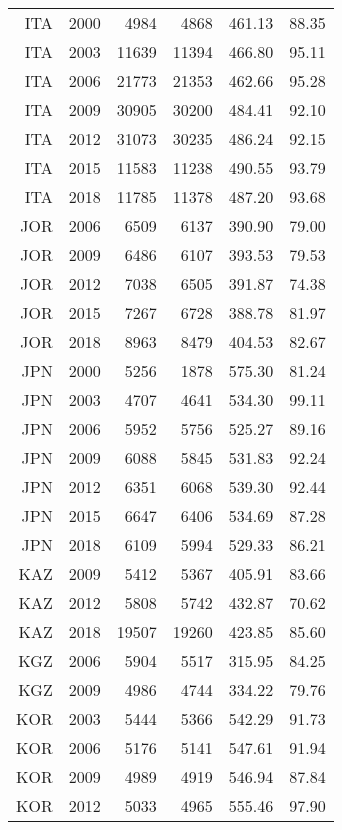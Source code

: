 \begin{longtable}{|r|r|r|r|r|r|}
    ITA   & 2000  & 4984  & 4868  & 461.13 & 88.35 \\
    ITA   & 2003  & 11639 & 11394 & 466.80 & 95.11 \\
    ITA   & 2006  & 21773 & 21353 & 462.66 & 95.28 \\
    ITA   & 2009  & 30905 & 30200 & 484.41 & 92.10 \\
    ITA   & 2012  & 31073 & 30235 & 486.24 & 92.15 \\
    ITA   & 2015  & 11583 & 11238 & 490.55 & 93.79 \\
    ITA   & 2018  & 11785 & 11378 & 487.20 & 93.68 \\
    JOR   & 2006  & 6509  & 6137  & 390.90 & 79.00 \\
    JOR   & 2009  & 6486  & 6107  & 393.53 & 79.53 \\
    JOR   & 2012  & 7038  & 6505  & 391.87 & 74.38 \\
    JOR   & 2015  & 7267  & 6728  & 388.78 & 81.97 \\
    JOR   & 2018  & 8963  & 8479  & 404.53 & 82.67 \\
    JPN   & 2000  & 5256  & 1878  & 575.30 & 81.24 \\
    JPN   & 2003  & 4707  & 4641  & 534.30 & 99.11 \\
    JPN   & 2006  & 5952  & 5756  & 525.27 & 89.16 \\
    JPN   & 2009  & 6088  & 5845  & 531.83 & 92.24 \\
    JPN   & 2012  & 6351  & 6068  & 539.30 & 92.44 \\
    JPN   & 2015  & 6647  & 6406  & 534.69 & 87.28 \\
    JPN   & 2018  & 6109  & 5994  & 529.33 & 86.21 \\
    KAZ   & 2009  & 5412  & 5367  & 405.91 & 83.66 \\
    KAZ   & 2012  & 5808  & 5742  & 432.87 & 70.62 \\
    KAZ   & 2018  & 19507 & 19260 & 423.85 & 85.60 \\
    KGZ   & 2006  & 5904  & 5517  & 315.95 & 84.25 \\
    KGZ   & 2009  & 4986  & 4744  & 334.22 & 79.76 \\
    KOR   & 2003  & 5444  & 5366  & 542.29 & 91.73 \\
    KOR   & 2006  & 5176  & 5141  & 547.61 & 91.94 \\
    KOR   & 2009  & 4989  & 4919  & 546.94 & 87.84 \\
    KOR   & 2012  & 5033  & 4965  & 555.46 & 97.90 \\

\end{longtable}
